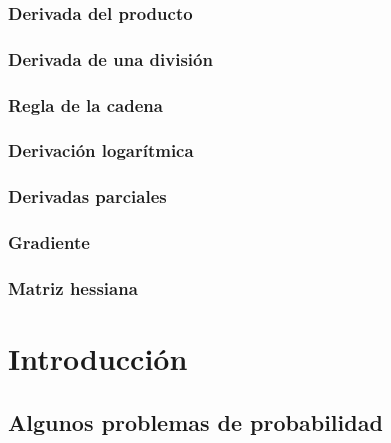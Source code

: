 \documentclass[
]{book}
\begin{document}
\hypertarget{derivada-del-producto}{%
\subsection{Derivada del producto}\label{derivada-del-producto}}

\hypertarget{derivada-de-una-divisiuxf3n}{%
\subsection{Derivada de una división}\label{derivada-de-una-divisiuxf3n}}

\hypertarget{regla-de-la-cadena}{%
\subsection{Regla de la cadena}\label{regla-de-la-cadena}}

\hypertarget{derivaciuxf3n-logaruxedtmica}{%
\subsection{Derivación logarítmica}\label{derivaciuxf3n-logaruxedtmica}}

\hypertarget{derivadas-parciales}{%
\subsection{Derivadas parciales}\label{derivadas-parciales}}

\hypertarget{gradiente}{%
\subsection{Gradiente}\label{gradiente}}

\hypertarget{matriz-hessiana}{%
\subsection{Matriz hessiana}\label{matriz-hessiana}}

\hypertarget{intro}{%
\chapter{Introducción}\label{intro}}

\hypertarget{algunos-problemas-de-probabilidad}{%
\section{Algunos problemas de probabilidad}\label{algunos-problemas-de-probabilidad}}
\end{document}
